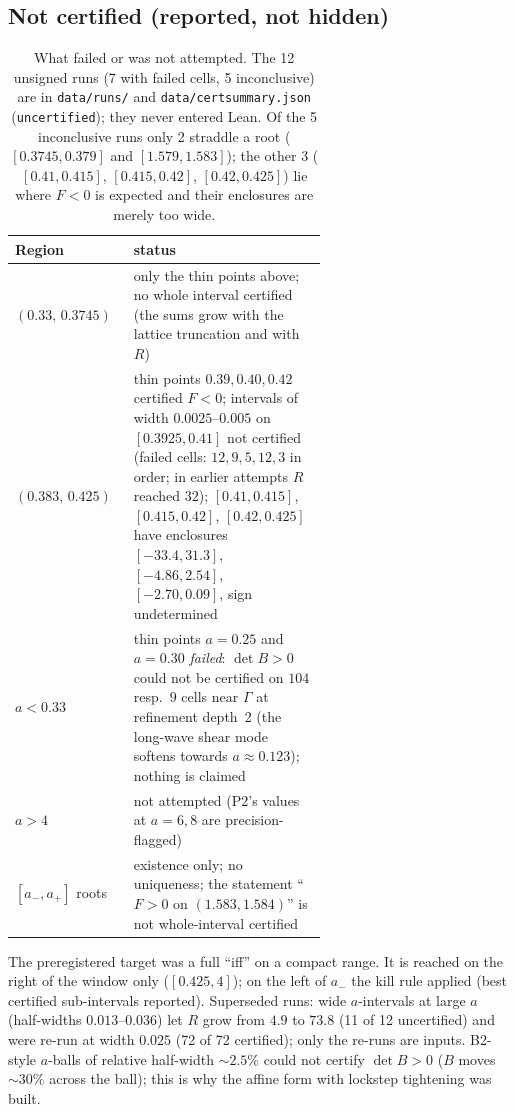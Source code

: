 \documentclass[10pt]{article}
\renewcommand{\_}{\textunderscore\penalty0\hspace{0pt}}
\begin{document}
\subsection{Not certified (reported, not hidden)}\label{sec:not}
\begin{table}[h]\centering\small
\begin{tabular}{@{}lp{0.62\linewidth}@{}}\toprule
Region & status\\\midrule
$(0.33,\,0.3745)$ & only the thin points above; no whole interval certified (the sums grow with the lattice truncation and with $R$)\\
$(0.383,\,0.425)$ & thin points $0.39,0.40,0.42$ certified $F<0$; intervals of width $0.0025$--$0.005$ on $[0.3925,0.41]$ not certified (failed cells: $12,9,5,12,3$ in order; in earlier attempts $R$ reached $32$); $[0.41,0.415]$, $[0.415,0.42]$, $[0.42,0.425]$ have enclosures $[-33.4,31.3]$, $[-4.86,2.54]$, $[-2.70,0.09]$, sign undetermined\\
$a<0.33$ & thin points $a=0.25$ and $a=0.30$ \emph{failed}: $\det B>0$ could not be certified on $104$ resp.\ $9$ cells near $\Gamma$ at refinement depth~2 (the long-wave shear mode softens towards $a\approx0.123$); nothing is claimed\\
$a>4$ & not attempted (P2's values at $a=6,8$ are precision-flagged)\\
$[a_-,a_+]$ roots & existence only; no uniqueness; the statement ``$F>0$ on $(1.583,1.584)$'' is not whole-interval certified\\\bottomrule
\end{tabular}
\caption{What failed or was not attempted. The 12 unsigned runs (7 with failed cells, 5 inconclusive) are in \texttt{data/runs/} and \texttt{data/cert\_summary.json} (\texttt{uncertified}); they never entered Lean. Of the 5 inconclusive runs only 2 straddle a root ($[0.3745,0.379]$ and $[1.579,1.583]$); the other 3 ($[0.41,0.415]$, $[0.415,0.42]$, $[0.42,0.425]$) lie where $F<0$ is expected and their enclosures are merely too wide.}
\end{table}
The preregistered target was a full ``iff'' on a compact range. It is reached on the right of the window only ($[0.425,4]$); on the left of $a_-$ the kill rule applied (best certified sub-intervals reported). Superseded runs: wide $a$-intervals at large $a$ (half-widths $0.013$--$0.036$) let $R$ grow from $4.9$ to $73.8$ (11 of 12 uncertified) and were re-run at width $0.025$ (72 of 72 certified); only the re-runs are inputs. B2-style $a$-balls of relative half-width $\sim2.5\%$ could not certify $\det B>0$ ($B$ moves $\sim30\%$ across the ball); this is why the affine form with lockstep tightening was built.
\end{document}
